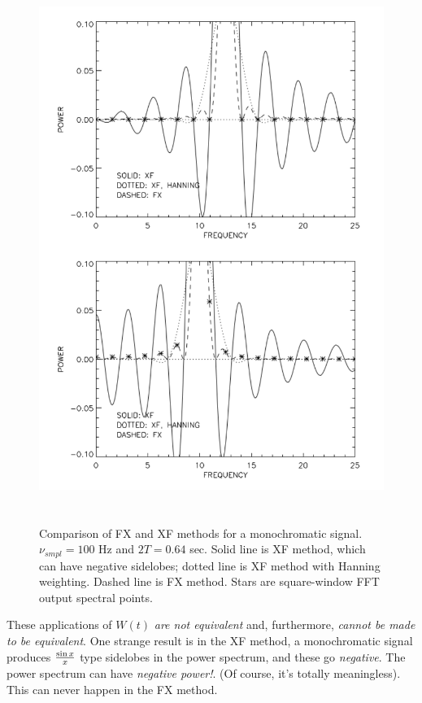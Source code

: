\documentclass[preprint]{aastex}
\begin{document}
\begin{figure}[H] \begin{center} \leavevmode
\includegraphics[height=7in]{fig4.pdf} \end{center} 

\caption{Comparison of FX and XF methods for a monochromatic signal.
$\nu_{smpl}=100$ Hz and $2T= 0.64$ sec. Solid line is XF method, which
can have negative sidelobes; dotted line is XF method with Hanning
weighting. Dashed line is FX method. Stars are square-window FFT output
spectral points. \label{figfour}} \end{figure}

	These applications of $W(t)$ {\it are not equivalent} and,
furthermore, {\it cannot be made to be equivalent}. One strange result
is in the XF method, a monochromatic signal produces $\sin x \over x$
type sidelobes in the power spectrum, and these go {\it negative}. The
power spectrum can have {\it negative power!}. (Of course, it's totally
meaningless). This can never happen in the FX method.
\end{document}
